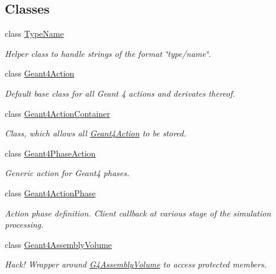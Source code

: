 \subsection*{Classes}
\begin{DoxyCompactItemize}
\item 
class \hyperlink{class_d_d4hep_1_1_simulation_1_1_type_name}{TypeName}
\begin{DoxyCompactList}\small\item\em Helper class to handle strings of the format \char`\"{}type/name\char`\"{}. \item\end{DoxyCompactList}\item 
class \hyperlink{class_d_d4hep_1_1_simulation_1_1_geant4_action}{Geant4Action}
\begin{DoxyCompactList}\small\item\em Default base class for all Geant 4 actions and derivates thereof. \item\end{DoxyCompactList}\item 
class \hyperlink{class_d_d4hep_1_1_simulation_1_1_geant4_action_container}{Geant4ActionContainer}
\begin{DoxyCompactList}\small\item\em Class, which allows all \hyperlink{class_d_d4hep_1_1_simulation_1_1_geant4_action}{Geant4Action} to be stored. \item\end{DoxyCompactList}\item 
class \hyperlink{class_d_d4hep_1_1_simulation_1_1_geant4_phase_action}{Geant4PhaseAction}
\begin{DoxyCompactList}\small\item\em Generic action for Geant4 phases. \item\end{DoxyCompactList}\item 
class \hyperlink{class_d_d4hep_1_1_simulation_1_1_geant4_action_phase}{Geant4ActionPhase}
\begin{DoxyCompactList}\small\item\em Action phase definition. Client callback at various stage of the simulation processing. \item\end{DoxyCompactList}\item 
class \hyperlink{class_d_d4hep_1_1_simulation_1_1_geant4_assembly_volume}{Geant4AssemblyVolume}
\begin{DoxyCompactList}\small\item\em Hack! Wrapper around \hyperlink{class_g4_assembly_volume}{G4AssemblyVolume} to access protected members. \item\end{DoxyCompactList}\item 

\end{DoxyCompactItemize}
